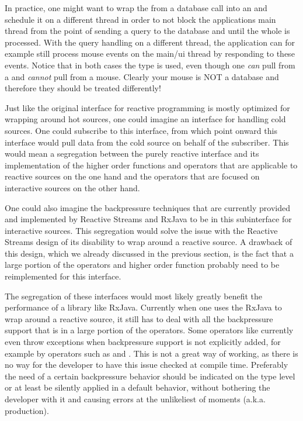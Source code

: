In practice, one might want to wrap the  from a database call into an \obs and schedule it on a different thread in order to not block the applications main thread from the point of sending a query to the database and until the whole  is processed. With the query handling on a different thread, the application can for example still process mouse events on the main/ui thread by responding to these events. Notice that in both cases the \obs type is used, even though one \emph{can} pull from a  and \emph{cannot} pull from a mouse. Clearly your mouse is NOT a database and therefore they should be treated differently!

Just like the original interface for reactive programming is mostly optimized for wrapping around hot sources, one could imagine an interface for handling cold sources. One could subscribe to this interface, from which point onward this interface would pull data from the cold source on behalf of the subscriber. This would mean a segregation between the purely reactive interface and its implementation of the higher order functions and operators that are applicable to reactive sources on the one hand and the operators that are focused on interactive sources on the other hand.

One could also imagine the backpressure techniques that are currently provided and implemented by Reactive Streams and RxJava to be in this subinterface for interactive sources. This segregation would solve the issue with the Reactive Streams design of its disability to wrap around a reactive source. A drawback of this design, which we already discussed in the previous section, is the fact that a large portion of the operators and higher order function probably need to be reimplemented for this interface.

The segregation of these interfaces would most likely greatly benefit the performance of a library like RxJava. Currently when one uses the RxJava \obs to wrap around a reactive source, it still has to deal with all the backpressure support that is in a large portion of the operators. Some operators like  currently even throw exceptions when backpressure support is not explicitly added, for example by operators such as  and . This is not a great way of working, as there is no way for the developer to have this issue checked at compile time. Preferably the need of a certain backpressure behavior should be indicated on the type level or at least be silently applied in a default behavior, without bothering the developer with it and causing errors at the unlikeliest of moments (a.k.a. production).

